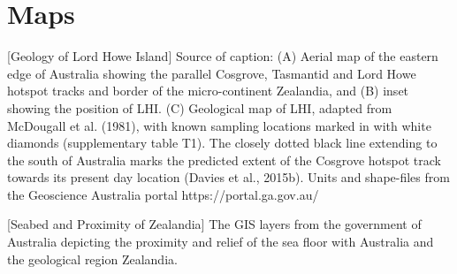 \documentclass[11pt]{article}
\begin{document}
\section{Maps}
\noindent%
\begin{minipage}{\linewidth}%
\captionsetup{width=0.8\linewidth}
[Geology of Lord Howe Island]{
Source of caption\cite{lhi}:
(A) Aerial map of the eastern edge of Australia showing the parallel Cosgrove, 
Tasmantid and Lord Howe hotspot tracks and border of the micro-continent
Zealandia, and (B) inset showing the position of LHI. (C) Geological map of 
LHI, adapted from McDougall et al. (1981), with known sampling locations 
marked in
with white diamonds (supplementary table T1). The closely dotted black line 
extending to the south of Australia marks the predicted extent of the Cosgrove 
hotspot
track towards its present day location (Davies et al., 2015b). Units and 
shape-files from the Geoscience Australia portal https://portal.ga.gov.au/}
\label{geol1}
\end{minipage}
\vskip5mm

\noindent%
\begin{minipage}{\linewidth}%
\captionsetup{width=0.8\linewidth}
[Seabed and Proximity of Zealandia]{
The GIS layers from the government of Australia depicting the proximity
and relief of the sea floor with Australia and the geological 
region Zealandia.}
\label{geol2}
\end{minipage}
\vskip5mm
\end{document}
